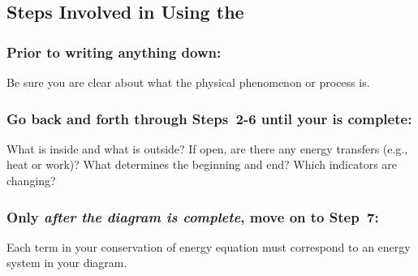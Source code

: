 \pagebreak

\subsection*{Steps Involved in Using the \EnergyDiagram{}}

\subsubsection*{Prior to writing anything down:}

\begin{benumerate}
	 Be sure you are clear about what the physical phenomenon or process is.
\end{benumerate}

\subsubsection*{Go back and forth through Steps~2-6 until your \EnergyDiagram{} is complete:}

\begin{benumerate}\setcounter{enumi}{1}
	 What is inside and what is outside?
	 If open, are there any energy transfers (e.g., heat or work)?
	 What determines the beginning and end?
	 Which indicators are changing?
\end{benumerate}

\subsubsection*{Only \emph{after the diagram is complete}, move on to Step~7:}

\begin{benumerate}\setcounter{enumi}{6}
	 Each term in your conservation of energy equation must correspond to an energy system in your diagram.
\end{benumerate}

\pagebreak

